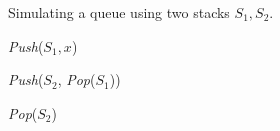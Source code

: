 
\begin{algorithm}[H]
  \caption{Simulating a queue using two stacks $S_1, S_2$.}
  \begin{algorithmic}[]
      \State \textsl{Push}($S_1, x$)
    \EndProcedure

    \Statex
	  \State \textsl{Push}($S_2$, \textsl{Pop}($S_1$))
	\EndWhile
      \EndIf

      \Statex
      \State \textsl{Pop}($S_2$)
    \EndProcedure
  \end{algorithmic}
\end{algorithm}
